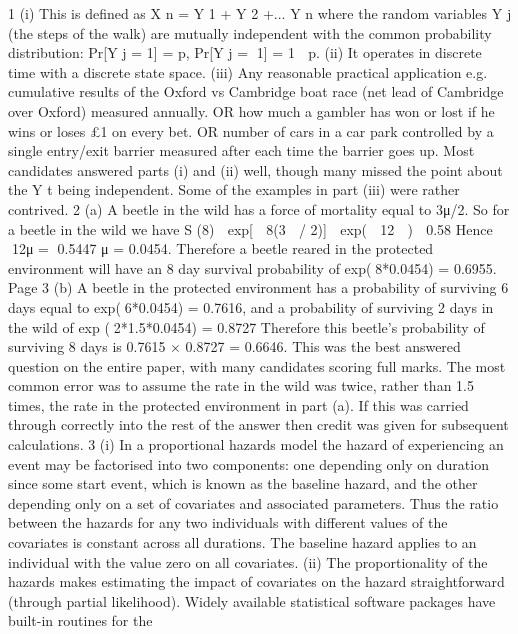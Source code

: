 \documentclass[a4paper,12pt]{article}
\begin{document}
\begin{enumerate}
1
(i)
This is defined as X n = Y 1 + Y 2 +... Y n
where the random variables Y j (the steps of the walk) are mutually
independent with the common probability distribution:
Pr[Y j = 1] = p,
Pr[Y j = 1] = 1  p.
(ii) It operates in discrete time with a discrete state space.
(iii) Any reasonable practical application
e.g. cumulative results of the Oxford vs Cambridge boat race (net lead
of Cambridge over Oxford) measured annually.
OR how much a gambler has won or lost if he wins or loses
£1 on every bet.
OR number of cars in a car park controlled by a single entry/exit
barrier measured after each time the barrier goes up.
Most candidates answered parts (i) and (ii) well, though many missed the point about the Y t
being independent. Some of the examples in part (iii) were rather contrived.
2
(a)
A beetle in the wild has a force of mortality equal to 3μ/2.
So for a beetle in the wild
we have S (8)  exp[  8(3  / 2)]  exp(  12  )  0.58
Hence
12μ = 0.5447
μ = 0.0454.
Therefore a beetle reared in the protected environment will have an 8 day
survival probability of
exp(8*0.0454) = 0.6955.
Page 3 %
(b)
A beetle in the protected environment has a probability of surviving 6 days
equal to
exp(6*0.0454) = 0.7616,
and a probability of surviving 2 days in the wild of
exp (2*1.5*0.0454) = 0.8727
Therefore this beetle’s probability of surviving 8 days is
0.7615 × 0.8727 = 0.6646.
This was the best answered question on the entire paper, with many candidates scoring full
marks. The most common error was to assume the rate in the wild was twice, rather than 1.5
times, the rate in the protected environment in part (a). If this was carried through correctly
into the rest of the answer then credit was given for subsequent calculations.
3
(i)
In a proportional hazards model the hazard of experiencing an event
may be factorised into two components:
one depending only on duration since some start event, which is known as the
baseline hazard, and the other depending only on a set of covariates and
associated parameters.
Thus the ratio between the hazards for any two individuals with different
values of the covariates is constant across all durations.
The baseline hazard applies to an individual with the value zero on all
covariates.
(ii)
The proportionality of the hazards makes estimating the impact of
covariates on the hazard straightforward (through partial likelihood).
Widely available statistical software packages have built-in routines for the

\end{enumerate}
\end{document}
